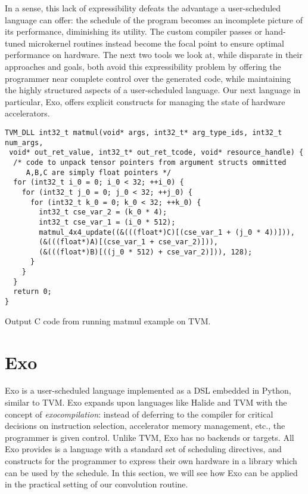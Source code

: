 \documentclass[acmsmall, nonacm=true]{acmart}
\begin{document}
In a sense, this lack of expressibility defeats the advantage a user-scheduled language can offer: the schedule of the program becomes an incomplete picture of its performance, diminishing its utility. The custom compiler passes or hand-tuned microkernel routines instead become the focal point to ensure optimal performance on hardware. The next two tools we look at, while disparate in their approaches and goals, both avoid this expressibility problem by  offering the programmer near complete control over the generated code, while maintaining the highly structured aspects of a user-scheduled language. Our next language in particular, Exo, offers explicit constructs for managing the state of hardware accelerators.








\begin{listing}
\centering
\begin{verbatim}
TVM_DLL int32_t matmul(void* args, int32_t* arg_type_ids, int32_t num_args,
 void* out_ret_value, int32_t* out_ret_tcode, void* resource_handle) {
  /* code to unpack tensor pointers from argument structs ommitted
     A,B,C are simply float pointers */
  for (int32_t i_0 = 0; i_0 < 32; ++i_0) {
    for (int32_t j_0 = 0; j_0 < 32; ++j_0) {
      for (int32_t k_0 = 0; k_0 < 32; ++k_0) {
        int32_t cse_var_2 = (k_0 * 4);
        int32_t cse_var_1 = (i_0 * 512);
        matmul_4x4_update((&(((float*)C)[(cse_var_1 + (j_0 * 4))])),
        (&(((float*)A)[(cse_var_1 + cse_var_2)])),
        (&(((float*)B)[((j_0 * 512) + cse_var_2)])), 128);
      }
    }
  }
  return 0;
}
\end{verbatim}
\caption{Output C code from running matmul example on TVM.}
\label{lst:tvm_output}
\end{listing}

\section{Exo}

Exo \cite{exo} is a user-scheduled language implemented as a DSL embedded in Python, similar to TVM. Exo expands upon languages like Halide and TVM with the concept of \textit{exocompilation}: instead of deferring to the compiler for critical decisions on instruction selection, accelerator memory management, etc., the programmer is given control.  Unlike TVM, Exo has no backends or targets. All Exo provides is a language with a standard set of scheduling directives, and constructs for the programmer to express their own hardware in a library which can be used by the schedule. In this section, we will see how Exo can be applied in the practical setting of our convolution routine.
\end{document}
